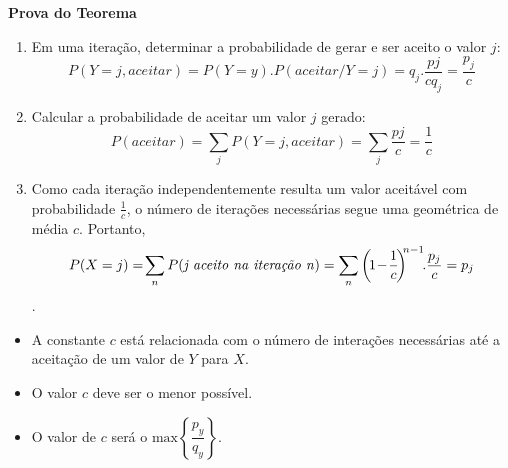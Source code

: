 \documentclass[
  letterpaper,
  DIV=11,
  numbers=noendperiod]{scrreprt}
\providecommand{\tightlist}{%
  \setlength{\itemsep}{0pt}\setlength{\parskip}{0pt}}\usepackage{longtable,booktabs,array}
\begin{document}
\begin{tcolorbox}[enhanced jigsaw, toprule=.15mm, arc=.35mm, colframe=quarto-callout-note-color-frame, breakable, opacityback=0, rightrule=.15mm, bottomrule=.15mm, left=2mm, leftrule=.75mm, colback=white]

\vspace{-3mm}\textbf{Prova do Teorema}\vspace{3mm}

\begin{enumerate}
\def\labelenumi{\arabic{enumi}.}
\tightlist
\item
  Em uma iteração, determinar a probabilidade de gerar e ser aceito o
  valor \(j\):
  \[P(Y=j,aceitar)= P(Y=y).P(aceitar/Y=j)= q_j.\dfrac{pj}{cq_j} = \dfrac{p_j}{c}\]
\item
  Calcular a probabilidade de aceitar um valor \(j\) gerado:
  \[P(aceitar)= \sum_j P(Y=j,aceitar)=\sum_j \dfrac{pj}{c} = \dfrac{1}{c}\]
\item
  Como cada iteração independentemente resulta um valor aceitável com
  probabilidade \(\frac{1}{c}\), o número de iterações necessárias segue
  uma geométrica de média \(c\). Portanto,
  \[P(X=j)=\! \sum_n P(\mbox{\textit{j aceito na iteração n}}) = \sum_n \left(\!1\!-\!\dfrac{1}{c}\!\right)^{\!\!n-1}\!\!.\dfrac{p_j}{c}=p_j\].
\end{enumerate}

\end{tcolorbox}

\begin{tcolorbox}[enhanced jigsaw, coltitle=black, bottomtitle=1mm, toprule=.15mm, arc=.35mm, colframe=quarto-callout-important-color-frame, breakable, opacityback=0, bottomrule=.15mm, rightrule=.15mm, titlerule=0mm, toptitle=1mm, title={Observações}, leftrule=.75mm, opacitybacktitle=0.6, left=2mm, colback=white, colbacktitle=quarto-callout-important-color!10!white]

\begin{itemize}
\item
  A constante \(c\) está relacionada com o número de interações
  necessárias até a aceitação de um valor de \(Y\) para \(X\).
\item
  O valor \(c\) deve ser o menor possível.
\item
  O valor de \(c\) será o \(\mbox{max}\left\{\dfrac{p_y}{q_y}\right\}\).
\end{itemize}

\end{tcolorbox}
\end{document}
